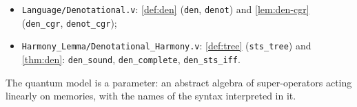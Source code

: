 \begin{itemize}
  (\texttt{menu}, \texttt{S\_T}); \newline
  \texttt{Testing/Smyth\_Soundness.v}: \cref{thm:char}
  (\texttt{alt\_pre\_sound}, \texttt{alt\_pre\_obs\_iff}) and its almost-sure
  counterpart (\texttt{alt\_as\_sound}, \texttt{alt\_as\_obs\_iff}).
\item \texttt{Language/Denotational.v}: \cref{def:den} (\texttt{den},
  \texttt{denot}) and \cref{lem:den-cgr} (\texttt{den\_cgr}, \texttt{denot\_cgr});
\item \texttt{Harmony\_Lemma/Denotational\_Harmony.v}: \cref{def:tree}
  (\texttt{sts\_tree}) and \cref{thm:den}: \newline
  \texttt{den\_sound}, \texttt{den\_complete}, \texttt{den\_sts\_iff}.
\fi
\end{itemize}
The quantum model is a parameter: an abstract algebra of super-operators
acting linearly on memories, with the names of the syntax interpreted in it.
